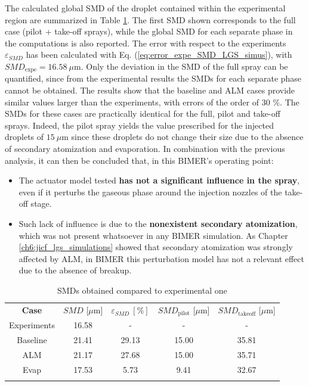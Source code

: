 The calculated global SMD of the droplet contained within the experimental region are summarized in Table \ref{tab:BIMER_dispersed_phase_SMDs}.  The first SMD shown corresponds to the full case (pilot + take-off sprays), while the global SMD for each separate phase in the computations is also reported.  The error with respect to the experiments $\varepsilon_{SMD}$ has been calculated with Eq. (\ref{eq:error_expe_SMD_LGS_simus}), with $SMD_\mathrm{expe} = 16.58~\mu$m. Only the deviation in the SMD of the full spray can be quantified, since from the experimental results the SMDs for each separate phase cannot be obtained. The results show that the baseline and ALM cases provide similar values larger than the experiments, with errors of the order of 30 $\%$. The SMDs for these cases are practically identical for the full, pilot and take-off sprays. Indeed, the pilot spray yields the value prescribed for the injected droplets of $15~\mu$m since these droplets do not change their size due to the absence of secondary atomization and evaporation. In combination with the previous analysis, it can then be concluded that, in this BIMER's operating point:

\begin{itemize}

	\item The actuator model tested \textbf{has not a significant influence in the spray}, even if it perturbs the gaseous phase around the injection nozzles of the take-off stage.
	
	\item Such lack of influence is due to the \textbf{nonexistent secondary atomization}, which was not present whatsoever in any BIMER simulation. As  Chapter \ref{ch6:jicf_lgs_simulations} showed that secondary atomization was strongly affected by ALM, in BIMER this perturbation model has not a relevant effect due to the absence of breakup.

\end{itemize}



\clearpage

\begin{table}[!h]
\centering
\caption{SMDs obtained compared to experimental one}
\begin{tabular}{ccccc}
\thickhline
\textbf{Case} & $SMD$ [$\mu$m] & $\varepsilon_{SMD}~\left[\% \right]$ & $SMD_\mathrm{pilot}$ [$\mu$m] & $SMD_\mathrm{takeoff}$ [$\mu$m]   \\
\thickhline
Experiments & 16.58 & - & - & - \\
Baseline & 21.41 & 29.13 &15.00 & 35.81 \\
ALM & 21.17 & 27.68 & 15.00 & 35.71 \\
Evap & 17.53 & 5.73 & 9.41 & 32.67 \\ 
\thickhline
\end{tabular}
\label{tab:BIMER_dispersed_phase_SMDs}
\end{table}



